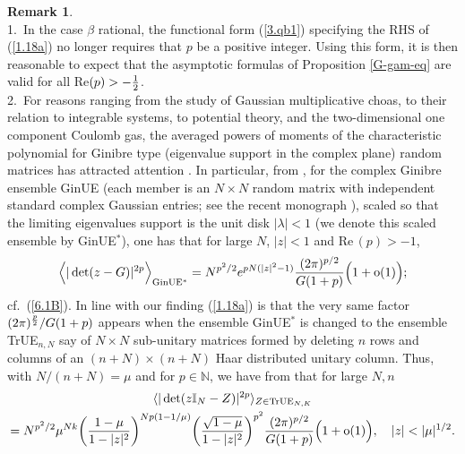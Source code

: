 \documentclass[11pt,a4paper]{article}
\numberwithin{equation}{section} %
\theoremstyle{plain}
\theoremstyle{definition}
\newtheorem{remark}{Remark}
\numberwithin{prop}{section}
\numberwithin{cor}{section}
\numberwithin{remark}{section}
\begin{document}

\begin{remark} ${}$ \\
1.~In the case $\beta$ rational, the functional form (\ref{3.qb1}) specifying the RHS of 
(\ref{1.18a}) no longer requires that $p$ be a
positive integer. Using this form, it is then reasonable to expect that the asymptotic formulas of Proposition \ref{G-gam-eq} are valid for all Re$(p) > - {1 \over 2}$. \\
2.~For reasons ranging from the study of Gaussian multiplicative choas, to their relation to
integrable systems, to potential theory, and the two-dimensional one component Coulomb gas,
the averaged powers of moments of the characteristic polynomial for Ginibre type
(eigenvalue support in the complex plane) random matrices has attracted attention
\cite{WW19,DS22,AKS21,SSD23,By24,BFL25,BCMS25,BY25}.
In particular, from \cite[Th.~1.1]{WW19}, for the complex Ginibre ensemble GinUE (each member is an $N \times N$ random matrix with independent standard complex Gaussian entries; see the recent monograph \cite{BF24}), scaled so that the limiting eigenvalues support is the unit disk $|\lambda|<1$ (we denote this scaled ensemble by GinUE${}^*$),
one has that for large $N$, $|z|<1$ and
Re$\,(p) > -1$,
\begin{equation}\label{G1}
\Big \langle | \det (z - G) |^{2p} \Big \rangle_{{\rm GinUE}{}^*}=
N^{{p^2 / 2} }
e^{p N (|z|^2 - 1)}
{(2 \pi)^{p / 2} \over G(1 + p)}\Big (1 + {\rm o}(1) \Big );
\end{equation}
cf.~(\ref{6.1B}). In line with our finding
(\ref{1.18a})
is that the very same factor $(2 \pi)^{p \over 2}/G(1 + p)$ appears when the ensemble
GinUE${}^*$ is changed to the ensemble TrUE${}_{n,N}$ say of
$N \times N$ sub-unitary matrices formed by
deleting $n$ rows and columns of an $(n+N) \times (n+N)$ Haar distributed unitary column. Thus,
with $N/(n+N) = \mu$ and for $p \in \mathbb N$, we have from
\cite{SSD23} that for large $N,n$
\begin{multline}\label{7.Y1a} 
   \langle | \det (z \mathbb I_N -  Z) |^{2p} \rangle_{Z \in {\rm TrUE}_{N,K}}   \\= N^{p^2/2}\mu^{Nk} 
   \bigg ( {1 - \mu \over 1 - | z|^2} \bigg )^{N p (1 - 1/\mu)} 
   \bigg ( {\sqrt{1 - \mu} \over 1 - | z|^2} \bigg )^{p^2}  
   {(2 \pi )^{p/2} \over G(1+p)} \Big ( 1 + {\rm o}(1) \Big ), \quad |z| < |\mu|^{1/2}.
   \end{multline}    
\\



\end{remark}
\end{document}
